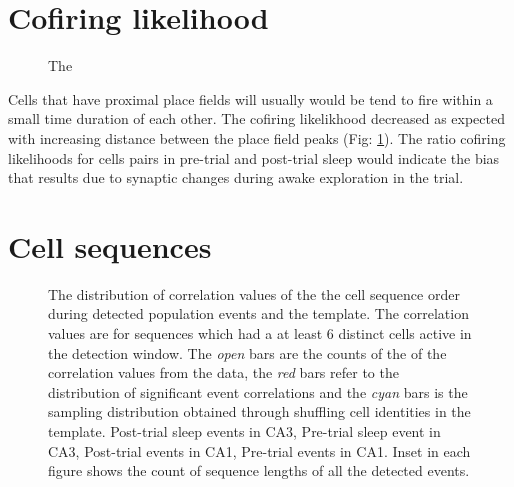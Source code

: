 \section{Cofiring likelihood}
\begin{figure}[htb!]
\centering
{}
\caption[Pairwise cofiring]{The }
\label{fig:cfvsdist}
\end{figure}

\begin{figure}[hb!]
\centering

\end{figure}

Cells that have proximal place fields will usually would be tend to fire within a small time duration of each other. The cofiring likelikhood decreased as expected with increasing distance between the place field peaks (Fig: \ref{fig:cfvsdist}). The ratio cofiring likelihoods for cells pairs in pre-trial and post-trial sleep would indicate the bias that results due to synaptic changes during awake exploration in the trial.\\

\section{ Cell sequences}
\begin{figure}[H]
\centering
{}
\caption[Template matching analysis]{The distribution of correlation values of the the cell sequence order during detected population events and the template. The correlation values are for sequences which had a at least 6 distinct cells active in the detection window. The \emph{open} bars are the counts of the of the correlation values from the data, the \emph{red} bars refer to the distribution of significant event correlations and the \emph{cyan} bars is the sampling distribution obtained through shuffling cell identities in the template.  Post-trial sleep events in CA3,   Pre-trial sleep event in CA3,  Post-trial events in CA1,   Pre-trial events in CA1. Inset in each figure shows the count of sequence lengths of all the detected events.}
\label{tmcorr}
\end{figure}

